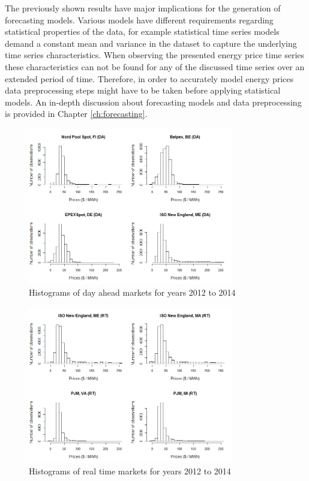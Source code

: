 The previously shown results have major implications for the generation of forecasting models. Various models have different requirements regarding statistical properties of the data, for example statistical time series models demand a constant mean and variance in the dataset to capture the underlying time series characteristics. When observing the presented energy price time series these characteristics can not be found for any of the discussed time series over an extended period of time. Therefore, in order to accurately model energy prices data preprocessing steps might have to be taken before applying statistical models. An in-depth discussion about forecasting models and data preprocessing is provided in Chapter \ref{ch:forecasting}. 



\begin{figure}[htbp]
	\centering
		\includegraphics[width=0.8\textwidth]{figures/data_analysis/Histograms_da_2012_2014.png}
	\caption{Histograms of day ahead markets for years 2012 to 2014}
	\label{fig:Histograms_da_2012_2014}
\end{figure}

\begin{figure}[htbp]
	\centering
		\includegraphics[width=0.8\textwidth]{figures/data_analysis/Histograms_rt_2012_2014.png}
	\caption{Histograms of real time markets for years 2012 to 2014}
	\label{fig:Histograms_rt_2012_2014}
\end{figure}




